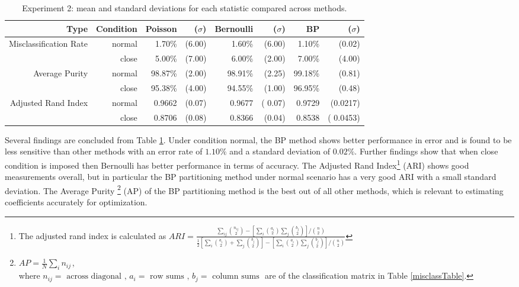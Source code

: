 \documentclass[11pt,letterpaper]{article}
\numberwithin{equation}{section}
\numberwithin{equation}{section}
\numberwithin{equation}{section}
\begin{document}
\begin{table}[!htb]
\begin{center}
\caption{Experiment 2: mean and standard deviations for each statistic compared across methods.}
\label{table:exper2}
\begin{tabular}{rrrrrrrr}
\hline\hline
Type   & Condition & Poisson & ($\sigma $) & Bernoulli & ($ \sigma $) & BP & ($ \sigma $) \\
\hline
Misclassification Rate& normal        & 1.70\% & (6.00)       & 1.60\%  & (6.00)         & 1.10\% & (0.02)         \\
       & close      & 5.00\% & (7.00)       & 6.00\% & (2.00)         & 7.00\% & (4.00)         \\
Average Purity & normal     & 98.87\% & (2.00)    & 98.91\% & (2.25)      & 99.18\% & (0.81)     \\
       & close       & 95.38\% & (4.00)    & 94.55\% & (1.00)      & 96.95\% & (0.48)      \\
Adjusted Rand Index  & normal      & 0.9662 & (0.07)    & 0.9677  & ( 0.07)     & 0.9729 & (0.0217)      \\
       & close         & 0.8706 & (0.08)    & 0.8366 & (0.04)      & 0.8538 & ( 0.0453) \\
       \hline\hline
\end{tabular}
\end{center}
\end{table}
Several findings are concluded from Table \ref{table:exper2}. Under condition normal, the BP method shows better performance in error and is found to be less sensitive than other methods with an error rate of $ 1.10 \% $ and a standard deviation of $ 0.02 \% $.  Further findings show that when close condition is imposed then Bernoulli has better performance in terms of accuracy. The Adjusted Rand Index\footnote{The adjusted rand index is calculated as  $ARI = \frac{ \sum_{ij} \binom{n_{ij}}{2} - [\sum_i \binom{a_i}{2} \sum_j \binom{b_j}{2}] / \binom{n}{2} }{ \frac{1}{2} [\sum_i \binom{a_i}{2} + \sum_j \binom{b_j}{2}] - [\sum_i \binom{a_i}{2} \sum_j \binom{b_j}{2}] / \binom{n}{2} }$ } (ARI) shows good measurements overall, but in particular the BP partitioning method under normal scenario has a very good ARI with a small standard deviation. The Average Purity \footnote{ $AP = \frac{1}{N} \sum_i  n_{ij\, }$, \\ where $n_{ij} = \text{ across diagonal },\, a_i = \text{ row sums },\,b_j = \text { column sums }$ are of the classification matrix in Table \ref{misclassTable}.} (AP) of the BP partitioning method is the best out of all other methods, which is relevant to estimating coefficients accurately for optimization.
\end{document}

